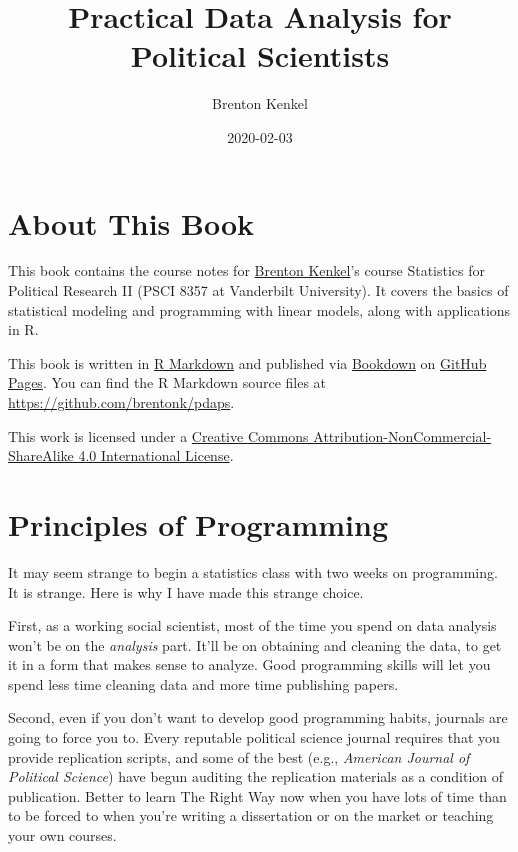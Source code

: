 \documentclass[
  12pt,
  oneside,openany]{book}
\title{Practical Data Analysis for Political Scientists}
\author{Brenton Kenkel}
\date{2020-02-03}
\begin{document}
\maketitle

{
\setcounter{tocdepth}{1}
\tableofcontents
}
\hypertarget{about-this-book}{%
\chapter{About This Book}\label{about-this-book}}

This book contains the course notes for \href{http://bkenkel.com}{Brenton Kenkel}'s course Statistics for Political Research II (PSCI 8357 at Vanderbilt University). It covers the basics of statistical modeling and programming with linear models, along with applications in R.

This book is written in \href{http://rmarkdown.rstudio.com}{R Markdown} and published via \href{https://bookdown.org}{Bookdown} on \href{https://pages.github.com}{GitHub Pages}. You can find the R Markdown source files at \url{https://github.com/brentonk/pdaps}.

This work is licensed under a \href{http://creativecommons.org/licenses/by-nc-sa/4.0/}{Creative Commons Attribution-NonCommercial-ShareAlike 4.0 International License}.

\hypertarget{programming}{%
\chapter{Principles of Programming}\label{programming}}

It may seem strange to begin a statistics class with two weeks on programming. It is strange. Here is why I have made this strange choice.

First, as a working social scientist, most of the time you spend on data analysis won't be on the \emph{analysis} part. It'll be on obtaining and cleaning the data, to get it in a form that makes sense to analyze. Good programming skills will let you spend less time cleaning data and more time publishing papers.

Second, even if you don't want to develop good programming habits, journals are going to force you to. Every reputable political science journal requires that you provide replication scripts, and some of the best (e.g., \emph{American Journal of Political Science}) have begun auditing the replication materials as a condition of publication. Better to learn The Right Way now when you have lots of time than to be forced to when you're writing a dissertation or on the market or teaching your own courses.
\end{document}
